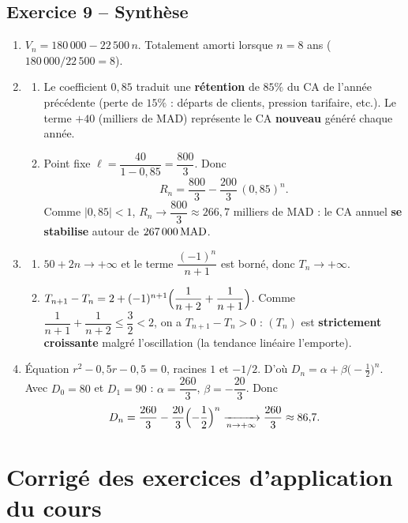 \documentclass[11pt,a4paper]{article}
\begin{document}
\subsection{Exercice 9 -- Synthèse}

\begin{enumerate}
  \item $V_n = 180\,000 - 22\,500\, n$. Totalement amorti lorsque $n=8$ ans ($180\,000/22\,500=8$).

  \item
  \begin{enumerate}
    \item Le coefficient $0{,}85$ traduit une \textbf{rétention} de $85\%$ du CA de l'année précédente (perte de $15\%$ : départs de clients, pression tarifaire, etc.). Le terme $+40$ (milliers de MAD) représente le CA \textbf{nouveau} généré chaque année.
    \item Point fixe $\ell=\dfrac{40}{1-0{,}85}=\dfrac{800}{3}$. Donc
    \[
    R_n = \dfrac{800}{3} - \dfrac{200}{3}\,(0{,}85)^n.
    \]
    Comme $\lvert 0{,}85\rvert<1$, $R_n\to \dfrac{800}{3}\approx 266{,}7$ milliers de MAD : le CA annuel \textbf{se stabilise} autour de $267\,000\,\mathrm{MAD}$.
  \end{enumerate}

  \item
  \begin{enumerate}
    \item $50+2n\to+\infty$ et le terme $\dfrac{(-1)^n}{n+1}$ est borné, donc $T_n\to+\infty$.
    \item $T_{n+1}-T_n = 2 + (-1)^{n+1}\Bigl(\dfrac{1}{n+2}+\dfrac{1}{n+1}\Bigr)$. Comme $\dfrac{1}{n+1}+\dfrac{1}{n+2}\leq \dfrac32<2$, on a $T_{n+1}-T_n>0$ : $(T_n)$ est \textbf{strictement croissante} malgré l'oscillation (la tendance linéaire l'emporte).
  \end{enumerate}

  \item Équation $r^2-0{,}5r-0{,}5=0$, racines $1$ et $-1/2$. D'où $D_n=\alpha+\beta\bigl(-\tfrac12\bigr)^n$. Avec $D_0=80$ et $D_1=90$ : $\alpha=\dfrac{260}{3}$, $\beta=-\dfrac{20}{3}$. Donc
  \[
  D_n = \dfrac{260}{3} - \dfrac{20}{3}\Bigl(-\dfrac12\Bigr)^n \xrightarrow[n\to+\infty]{} \dfrac{260}{3}\approx 86{,}7.
  \]
\end{enumerate}

\clearpage
\section{Corrigé des exercices d'application du cours}
\end{document}
